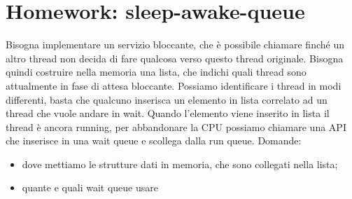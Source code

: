 \documentclass[12pt, oneside]{extbook}
\begin{document}
\section*{Homework: sleep-awake-queue}
Bisogna implementare un servizio bloccante, che è possibile chiamare finché un altro thread non decida di fare qualcosa verso questo thread originale. Bisogna quindi costruire nella memoria una lista, che indichi quali thread sono attualmente in fase di attesa bloccante. Possiamo identificare i thread in modi differenti, basta che qualcuno inserisca un elemento in lista correlato ad un thread che vuole andare in wait. Quando l'elemento viene inserito in lista il thread è ancora running, per abbandonare la CPU possiamo chiamare una API che inserisce in una wait queue e scollega dalla run queue. Domande: 
\begin{itemize}
\item dove mettiamo le strutture dati in memoria, che sono collegati nella lista;
\item quante e quali wait queue usare
\end{itemize}
\end{document}
